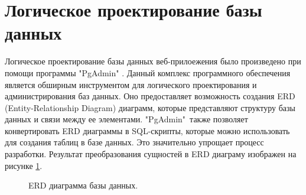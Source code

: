     \section{Логическое проектирование базы данных}
        Логическое проектирование базы данных веб-прилоежения было произведено %
        при помощи программы "PgAdmin" \cite{pg-admin}. Данный комплекс программного обеспечения %
        является обширным инструментом для логического проектирования и %
        администрирования баз данных. Оно предоставляет возможность %
        создания ERD (Entity-Relationship Diagram) диаграмм, которые %
        представляют структуру базы данных и связи между ее элементами.
        "PgAdmin"\ также позволяет конвертировать ERD диаграммы в %
        SQL-скрипты, которые можно использовать для создания таблиц в %
        базе данных. Это значительно упрощает процесс разработки. %
        Результат преобразования сущностей в ERD диаграму изображен на рисунке \ref{erd_diagram}.

        \newpage
        \begin{landscape}
            \begin{figure}[H]%
                \centering
                \caption{ERD диаграмма базы данных.} \label{erd_diagram}
            \end{figure} 

        \end{landscape}